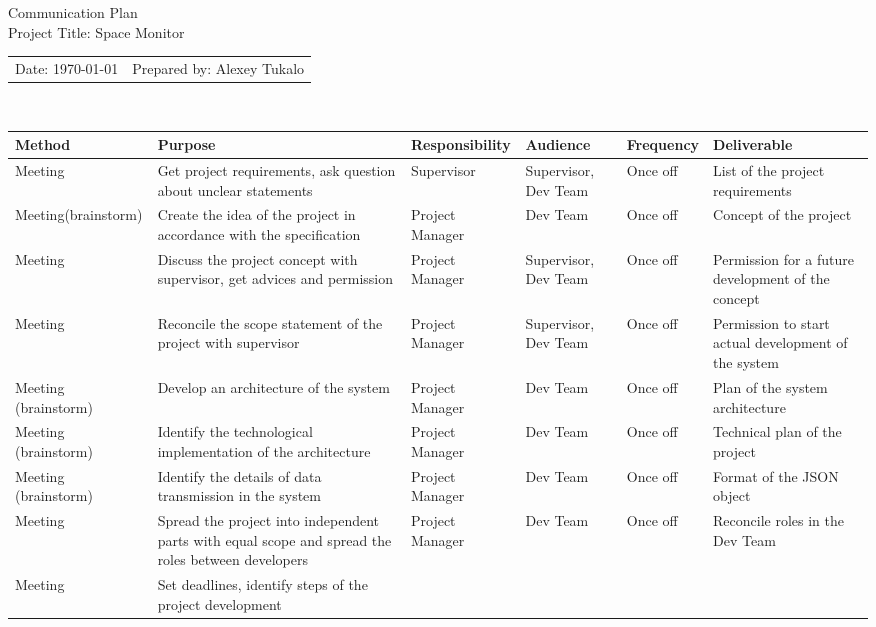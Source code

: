 \documentclass[english]{article}
\date{}
\begin{document}
 \begin{center}\begin{Large}
  Communication Plan \\
Project Title: Space Monitor
 \end{Large}

 \end{center}

\begin{tabular}{l l}
Date: \today  & Prepared by: Alexey Tukalo\\
\end{tabular}\\
\begin{tabular}{|p{3cm}|p{5cm}|p{3cm}|p{4cm}|p{1.5cm}|p{5cm}|}
\hline
Method & Purpose & Responsibility & Audience & Frequency & Deliverable\\
\hline
Meeting & 
Get project requirements, ask question about unclear statements &
Supervisor &
Supervisor, Dev Team &
Once off &
List of the project requirements \\
\hline 
Meeting(brainstorm) & 
Create the idea of the project in accordance with the specification &
Project Manager &
Dev Team &
Once off &
Concept of the project \\
\hline 
Meeting & 
Discuss the project concept with supervisor, get advices and permission &
Project Manager &
Supervisor, Dev Team &
Once off &
Permission for a future development of the concept\\
\hline 
Meeting & 
Reconcile the scope statement of the project with supervisor &
Project Manager &
Supervisor, Dev Team &
Once off &
Permission to start actual development of the system\\
\hline 
Meeting (brainstorm) & 
Develop an architecture of the system &
Project Manager &
Dev Team &
Once off &
Plan of the system architecture\\
\hline 
Meeting (brainstorm) & 
Identify the technological implementation of the architecture &
Project Manager &
Dev Team &
Once off &
Technical plan of the project\\
\hline 
Meeting (brainstorm) & 
Identify the details of data transmission in the system &
Project Manager &
Dev Team &
Once off &
Format of the JSON object\\
\hline 
Meeting & 
Spread the project into independent parts with equal scope and spread the roles between developers &
Project Manager &
Dev Team &
Once off &
Reconcile roles in the Dev Team\\
\hline 
Meeting & 
Set deadlines, identify steps of the project development &

\end{tabular}
\end{document}
